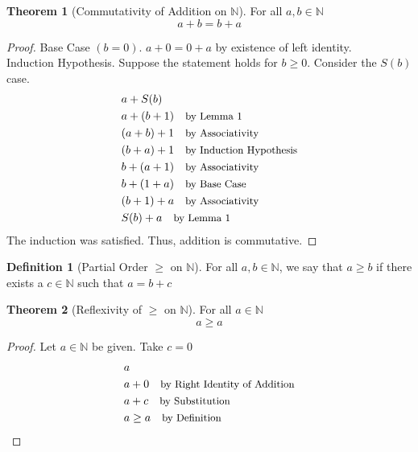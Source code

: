 \documentclass[12pt]{article}
\newcommand{\stext}[1]{\quad\text{\small #1}}
\theoremstyle{definition}
\newtheorem{theorem}{Theorem}
\newtheorem{definition}{Definition}
\begin{document}
\begin{theorem}[Commutativity of Addition on $\mathbb{N}$] For all $a, b \in \mathbb{N}$
    \begin{equation*}
        a + b = b + a
    \end{equation*}
\end{theorem}
\begin{proof} Base Case $(b = 0)$. $a + 0 = 0 + a$ by existence of left identity. \\
    Induction Hypothesis. Suppose the statement holds for $b \geq 0$. Consider the $S(b)$ case.
    \begin{align*}
        & a + S(b) \\
        & a + (b + 1) \stext{by Lemma 1} \\
        & (a + b) + 1 \stext{by Associativity} \\
        & (b + a) + 1 \stext{by Induction Hypothesis} \\
        & b + (a + 1) \stext{by Associativity} \\
        & b + (1 + a) \stext{by Base Case} \\
        & (b + 1) + a \stext{by Associativity} \\
        & S(b) + a \stext{by Lemma 1}
    \end{align*}
    The induction was satisfied. Thus, addition is commutative.
\end{proof}

\begin{definition}[Partial Order $\geq$ on $\mathbb{N}$]
    For all $a, b \in \mathbb{N}$, we say that $a \geq b$ if there exists a $c \in \mathbb{N}$ such that $a = b + c$
\end{definition}

\begin{theorem}[Reflexivity of $\geq$ on $\mathbb{N}$] For  all $a \in \mathbb{N}$
    \begin{equation*}
        a \geq a
    \end{equation*}
\end{theorem}
\begin{proof}
    Let $a \in \mathbb{N}$ be given. Take $c = 0$
    \begin{align*}
        & a \\
        & a + 0 \stext{by Right Identity of Addition} \\
        & a + c \stext{by Substitution} \\ 
        & a \geq a \stext{by Definition}
    \end{align*}
\end{proof}
\end{document}
